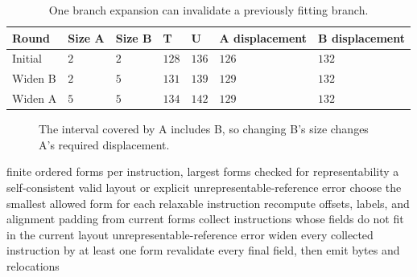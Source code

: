 \begin{table}[htbp]
\caption{One branch expansion can invalidate a previously fitting branch.}
\label{tab:ch55-relaxation}
\centering
\begin{tabular}{lllllll}
\toprule
Round & Size A & Size B & T & U & A displacement & B displacement \\
\midrule
Initial & $2$ & $2$ & $128$ & $136$ & $126$ & $132$ \\
Widen B & $2$ & $5$ & $131$ & $139$ & $129$ & $132$ \\
Widen A & $5$ & $5$ & $134$ & $142$ & $129$ & $132$ \\
\bottomrule
\end{tabular}
\end{table}

\begin{figure}[htbp]
\centering
{}
\caption{The interval covered by A includes B, so changing B's size changes A's required displacement.}
\label{fig:ch55-relaxation}
\end{figure}

\begin{algorithm}[htbp]
\caption{Find a valid layout by monotonically widening instruction forms.}
\label{alg:ch55-widen}
\begin{pseudocode}
\Require finite ordered forms per instruction, largest forms checked for representability
\Ensure a self-consistent valid layout or explicit unrepresentable-reference error
\State choose the smallest allowed form for each relaxable instruction
\Repeat
  \State recompute offsets, labels, and alignment padding from current forms
  \State collect instructions whose fields do not fit in the current layout
    \State \Return unrepresentable-reference error
  \EndIf
  \State widen every collected instruction by at least one form
\State revalidate every final field, then emit bytes and relocations
\end{pseudocode}
\end{algorithm}

